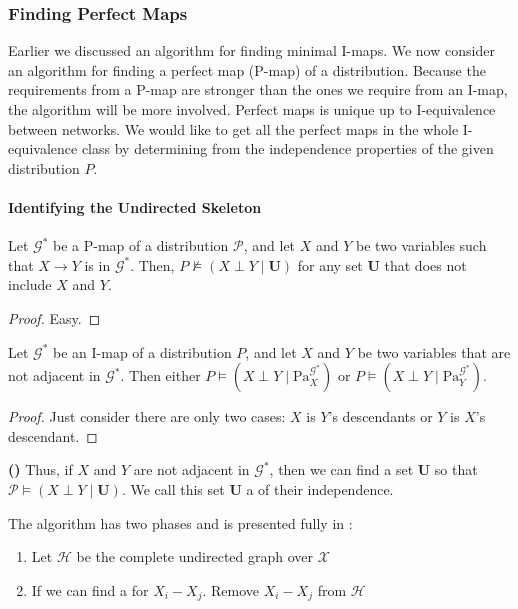 \documentclass{article}
\newcommand{\bfs}[1]{\textbf{({#1}) }}
\begin{document}
\subsubsection{Finding Perfect Maps}
Earlier we discussed an algorithm for finding minimal I-maps. We now consider an algorithm for finding a perfect map (P-map) of a distribution. Because the requirements from a P-map are stronger than the ones we require from an I-map, the algorithm will be more involved.
Perfect maps is unique up to I-equivalence between networks.
We would like to get all the perfect maps in the whole I-equivalence class by determining  from the independence properties of the given distribution $P$.
\paragraph{Identifying the Undirected Skeleton}
\begin{lema}
Let $\mathcal{G}^{*}$ be a P-map of a distribution $\mathcal{P}$, and let $X$ and $Y$ be two variables such that $X \rightarrow Y$ is in $\mathcal{G}^{*}$. Then, $P \not \models(X \perp Y \mid \boldsymbol{U})$ for any set $\boldsymbol{U}$ that does not include $X$ and $Y$.
\end{lema}
\begin{proof}
 Easy.
\end{proof}
\begin{lema}
Let $\mathcal{G}^{*}$ be an I-map of a distribution $P$, and let $X$ and $Y$ be two variables that are not adjacent in $\mathcal{G}^{*}$. Then either $P \models\left(X \perp Y \mid \mathrm{Pa}_{X}^{\mathcal{G}^{*}}\right)$ or $P \models\left(X \perp Y \mid \mathrm{Pa}_{Y}^{\mathcal{G}^{*}}\right)$.
\end{lema}
\begin{proof}
 Just consider there are only two cases: $X$ is $Y$’s descendants or $Y$ is $X$’s descendant.
\end{proof}
\begin{defa}\bfs{}
Thus, if $X$ and $Y$ are not adjacent in $\mathcal{G}^{*}$, then we can find a set $\boldsymbol{U}$ so that $\mathcal{P} \models(X \perp Y \mid \boldsymbol{U})$. We call this set $\boldsymbol{U}$ a  of their independence.
\end{defa}
  The algorithm has two phases and is presented fully in \cite[algorithm 3.3. Build-PMap-Skeleton]{koller2009probabilistic}:
\begin{enumerate}
    \item Let $\mathcal{H}$ be the complete undirected graph over $\mathcal{X}$
\item If we can find a   for $X_{i}-X_{j}$. Remove $X_{i}-X_{j}$ from $\mathcal{H}$
\end{enumerate}
\end{document}
